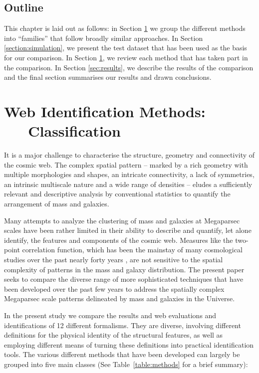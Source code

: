 \subsection{Outline}
This chapter is laid out as follows: in Section \ref{section:methods} we group the different methods into ``families'' that follow broadly similar approaches. In Section \ref{section:simulation}, we present the test dataset that has been used as the basis for our comparison. In Section \ref{section:methods}, we review each method that has taken part in the comparison. In Section \ref{sec:results}, we describe the results of the comparison and the final section summarises our results and drawn conclusions.

\section{Web Identification Methods: \ \ \ Classification}
\label{section:methods}

%


It is a major challenge to characterise the structure, geometry and connectivity of the cosmic web. The complex spatial pattern -- marked  
by a rich geometry with multiple morphologies and shapes, an intricate connectivity, a lack of  symmetries, an intrinsic multiscale nature and 
a wide range of densities -- eludes a sufficiently relevant and descriptive analysis by conventional statistics to quantify the arrangement of 
mass and galaxies. 

Many attempts to analyze the clustering of mass and galaxies at Megaparsec scales have been rather limited in their ability to describe and quantify, let 
alone identify, the features and components of the cosmic web. Measures like the two-point correlation function, which has been the mainstay of many 
cosmological studies over the past nearly forty years \citep{Peebles1980}, are not sensitive to the spatial complexity of patterns in the mass and galaxy distribution.  
The present paper seeks to compare the diverse range of more sophisticated techniques that have been developed over the past few years to address the 
spatially complex Megaparsec scale patterns delineated by mass and galaxies in the Universe. 

In the present study we compare the results and web evaluations and identifications of 12 different formalisms. 
They are diverse, involving different definitions for the physical identity of the structural features, as well 
as employing different means of turning these definitions into practical identification tools. The various 
different methods that have been developed can largely be grouped into five main classes (See Table~\ref{table:methods} for a brief summary):

